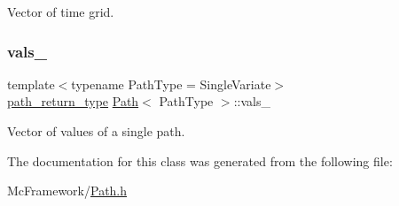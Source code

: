 Vector of time grid. 

\hypertarget{class_path_a6f90f314a504ea1c9828dd2aa999f6ff}{}\label{class_path_a6f90f314a504ea1c9828dd2aa999f6ff} 
\subsubsection{\texorpdfstring{vals\+\_\+}{vals\_}}
{\footnotesize\ttfamily template$<$typename Path\+Type = Single\+Variate$>$ \\
\hyperlink{class_path_a3b1c34a87f7867f6fed2e0a33f801e7d}{path\+\_\+return\+\_\+type} \hyperlink{class_path}{Path}$<$ Path\+Type $>$\+::vals\+\_\+\hspace{0.3cm}{\ttfamily [private]}}



Vector of values of a single path. 



The documentation for this class was generated from the following file\+:\begin{DoxyCompactItemize}
\item 
Mc\+Framework/\hyperlink{_path_8h}{Path.\+h}\end{DoxyCompactItemize}
